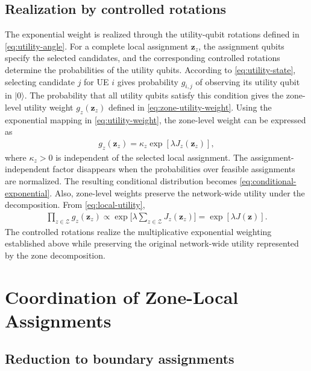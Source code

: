 \documentclass[journal]{IEEEtran}
\newcommand{\ket}[1]{\lvert #1 \rangle}
\begin{document}
{\subsection{Realization by controlled rotations}
The exponential weight is realized through the utility-qubit rotations defined in \eqref{eq:utility-angle}. For a complete local assignment $\bm z_z$, the assignment qubits specify the selected candidates, and the corresponding controlled rotations determine the probabilities of the utility qubits. According to \eqref{eq:utility-state}, selecting candidate $j$ for UE $i$ gives probability $g_{i,j}$ of observing its utility qubit in $\ket{0}$. The probability that all utility qubits satisfy this condition gives the zone-level utility weight $g_z(\bm z_z)$ defined in \eqref{eq:zone-utility-weight}.
Using the exponential mapping in \eqref{eq:utility-weight}, the zone-level weight can be expressed as
\begin{align}
g_z(\bm z_z)=\kappa_z\exp\!\left[\lambda J_z(\bm z_z)\right],
\label{eq:app-local-exponential}
\end{align}
where $\kappa_z>0$ is independent of the selected local assignment. The assignment-independent factor disappears when the probabilities
over feasible assignments are normalized. The resulting conditional distribution becomes \eqref{eq:conditional-exponential}. 
Also, zone-level weights preserve the network-wide utility under the decomposition. From \eqref{eq:local-utility},
\begin{align}
\prod_{z\in\mathcal Z}
g_z(\bm z_z)
\propto\exp\!\Big[\lambda\sum_{z\in\mathcal Z}J_z(\bm z_z)\Big]=\exp\!\left[\lambda J(\bm z)\right].
\label{eq:app-global-exponential}
\end{align}
The controlled rotations realize the multiplicative
exponential weighting established above while preserving the original
network-wide utility represented by the zone decomposition.

\vspace{-3mm}
\section{Coordination of Zone-Local Assignments}
\label{app:coordination}

\subsection{Reduction to boundary assignments}
\label{app:boundary-reduction}

}
\end{document}
